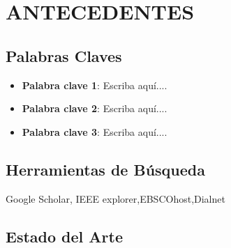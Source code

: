 \documentclass[12pt,letterpaper]{article}
\begin{document}
\section{ANTECEDENTES}

\subsection{Palabras Claves}
\begin{itemize}
	\item \textbf{Palabra clave 1}: Escriba aquí....
	\item \textbf{Palabra clave 2}: Escriba aquí....
	\item \textbf{Palabra clave 3}: Escriba aquí....
\end{itemize}


\subsection{Herramientas de Búsqueda}
Google Scholar, IEEE explorer,EBSCOhost,Dialnet

\subsection{Estado del Arte}
\end{document}
